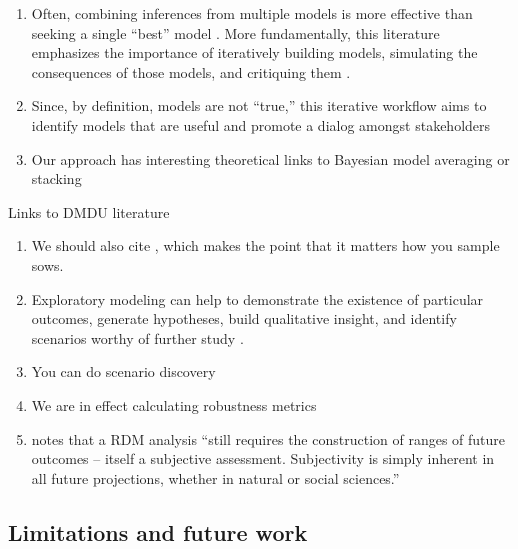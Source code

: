 \documentclass[12pt]{article}
\begin{document}
\begin{enumerate}
    \item Often, combining inferences from multiple models is more effective than seeking a single ``best'' model \citep{Yao:2018bu}.
          More fundamentally, this literature emphasizes the importance of iteratively building models, simulating the consequences of those models, and critiquing them \citep{gelman_workflow:2020}.
    \item Since, by definition, models are not ``true,'' this iterative workflow aims to identify models that are useful and promote a dialog amongst stakeholders \citep{gelman_philosophy:2013}
    \item Our approach has interesting theoretical links to Bayesian model averaging or stacking \citep{Yao:2018bu}
\end{enumerate}
Links to DMDU literature
\begin{enumerate}
    \item We should also cite \citet{quinn_exploratory:2020}, which makes the point that it matters how you sample \glspl{sow}.
    \item Exploratory modeling can help to demonstrate the existence of particular outcomes, generate hypotheses, build qualitative insight, and identify scenarios worthy of further study \citep[see][]{bankes:1993}.
    \item You can do scenario discovery
    \item We are in effect calculating robustness metrics \citep{mcphail_robustness:2019,herman:2015}
    \item \citet{schneider_scenarios:2002} notes that a RDM analysis ``still requires the construction of ranges of future outcomes -- itself a subjective assessment. Subjectivity is simply inherent in all future projections, whether in natural or social sciences.''
\end{enumerate}

\subsection{Limitations and future work}
\end{document}
